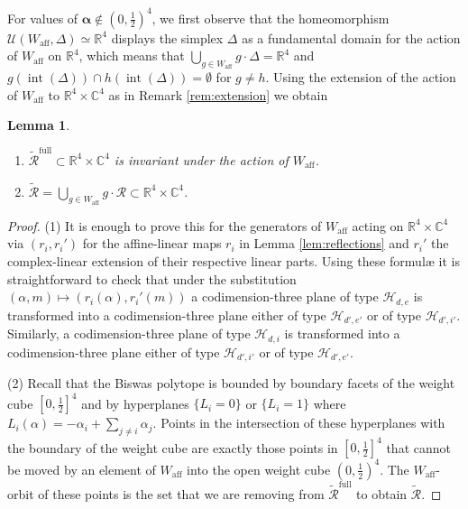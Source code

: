\documentclass[12pt,letterpaper,reqno]{amsart}
\def\bm#1{#1}%
\def\mathbf#1{#1}%
\newtheorem{lem}[thm]{Lemma}
\theoremstyle{remark}
\theoremstyle{definition}
\numberwithin{thm}{section}
\numberwithin{equation}{section}
\numberwithin{figure}{section}
\newcommand{\R}{\ensuremath{\mathbb R}}
\newcommand{\C}{\ensuremath{\mathbb C}}
\newcommand{\bfalpha}{\ensuremath{\bm \alpha}}
\newcommand{\aff}{\mathrm{aff}}
\newcommand{\bfm}{\mathbf{m}}
\newcommand{\Simplex}{\Delta}
\DeclareMathOperator{\interior}{int}
\begin{document}
For values of $\boldsymbol{\alpha} \not\in (0,\frac 12)^4$, we first observe that the homeomorphism $\mathcal{U}(W_{\mathrm{aff}}, \Simplex) \simeq \R^4$ displays the simplex $\Simplex$ as a fundamental domain for the action of $W_{\mathrm{aff}}$ on $\R^4$, which means that  $\bigcup_{g \in W_{\mathrm{aff}}} g \cdot \Simplex  = \R^4$ and $g(\interior(\Simplex)) \cap h(\interior(\Simplex)) = \emptyset$ for $g\neq h$. Using the extension of the action of $W_\aff$ to $\R^4 \times \C^4$ as in Remark \ref{rem:extension} we obtain
\begin{lem}\label{lem:saturation}\
\begin{enumerate}
\item $\widetilde{\mathcal{R}}^{\mathrm{full}} \subset \R^4 \times\C^4$ is invariant under the action of $W_\aff$.

\smallskip

\item $\widetilde{\mathcal{R}}=\bigcup_{g \in W_{\mathrm{aff}}} g \cdot \mathcal{R}  \subset \R^4 \times\C^4$.
\end{enumerate}
	\end{lem}


\begin{proof}
(1) It is enough to prove this for the generators of $W_\aff$ acting on $\R^4 \times \C^4$ via $(r_i, r_i')$ for the affine-linear maps $r_i$ in Lemma \ref{lem:reflections} and $r_i'$ the complex-linear extension of their respective linear parts. Using these formul{\ae} it is straightforward to check that under the substitution $(\bfalpha, \bfm)  \mapsto (r_i(\bfalpha), r_i'(\bfm))$ a codimension-three plane of type $\mathcal{H}_{d, \mathbf{e}}$ is transformed into a codimension-three plane either of type $\mathcal{H}_{d', \mathbf{e}'}$ or of type $\mathcal{H}_{d', i'}$. Similarly, a codimension-three plane of type $\mathcal{H}_{d, i}$ is transformed into a codimension-three plane either of type $\mathcal{H}_{d', i'}$  or of type $\mathcal{H}_{d', \mathbf{e}'}$. 


\smallskip

\noindent (2) Recall that the Biswas polytope is bounded by boundary facets of the weight cube $[0, \frac 12]^4$ and by hyperplanes $\{L_i=0\}$ or $\{L_i=1\}$ where $L_i(\bfalpha)= -\alpha_i + \sum_{j \neq i} \alpha_j$. Points in the intersection of these hyperplanes with the boundary of the weight cube are exactly those points in $[0, \frac 12]^4$ that cannot be moved by an element of $W_\aff$ into the open weight cube $(0, \frac 12)^4$. The $W_\aff$-orbit of these points is the set that we are removing from $\widetilde{\mathcal{R}}^{\mathrm{full}}$ to obtain $\widetilde{\mathcal{R}}$.
\end{proof}
\end{document}

